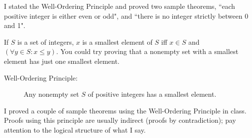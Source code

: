 \documentclass[12pt]{article}
\begin{document}
I stated the Well-Ordering Principle and proved two sample theorems, ``each positive integer is either even or odd", and ``there is no integer strictly between 0 and 1".

If $S$ is a set of integers, $x$ is a smallest element of $S$ iff $x \in S$ and $(\forall y \in S:x \leq y)$.  You could try proving that a nonempty set with a smallest element has just one smallest element.

\begin{description}

\item[Well-Ordering Principle:]  Any nonempty set $S$ of positive integers has a smallest element.

\end{description}

I proved a couple of sample theorems using the Well-Ordering Principle in class.  Proofs using this principle are usually indirect (proofs by contradiction);  pay attention to the logical structure of what I say.
\end{document}
